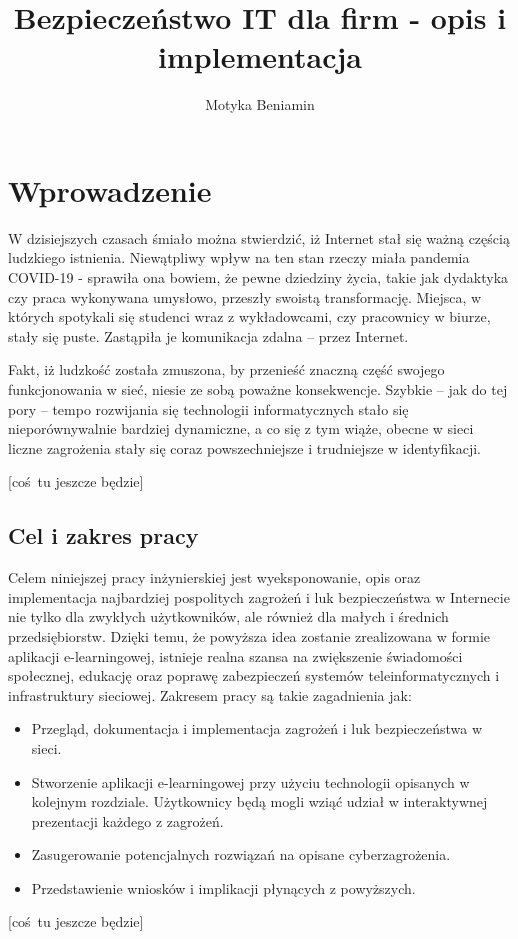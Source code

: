 \documentclass[12pt,twoside]{article}
\author{Motyka Beniamin}
\title{Bezpieczeństwo IT dla firm - opis i implementacja}
\begin{document}
\maketitle

\blankpage

\tableofcontents

\clearpage
\blankpage

\clearpage
\section{Wprowadzenie}

W dzisiejszych czasach śmiało można stwierdzić, iż	Internet stał się ważną częścią ludzkiego istnienia. Niewątpliwy wpływ na ten stan rzeczy miała pandemia COVID-19 - sprawiła ona bowiem, że pewne dziedziny życia, takie jak dydaktyka czy praca wykonywana umysłowo, przeszły swoistą transformację. Miejsca, w których spotykali się studenci wraz z wykładowcami, czy pracownicy w biurze, stały się puste. Zastąpiła je komunikacja zdalna -- przez Internet.

Fakt, iż ludzkość została zmuszona, by przenieść znaczną część swojego funkcjonowania w sieć, niesie ze sobą poważne konsekwencje. Szybkie -- jak do tej pory -- tempo rozwijania się technologii informatycznych stało się nieporównywalnie bardziej dynamiczne, a co się z tym wiąże, obecne w sieci liczne zagrożenia stały się coraz powszechniejsze i trudniejsze w identyfikacji.

[coś tu jeszcze będzie]

\subsection{Cel i zakres pracy}

Celem niniejszej pracy inżynierskiej jest wyeksponowanie, opis oraz implementacja najbardziej pospolitych zagrożeń i luk bezpieczeństwa w Internecie nie tylko dla zwykłych użytkowników, ale również dla małych i średnich przedsiębiorstw. Dzięki temu, że powyższa idea zostanie zrealizowana w formie aplikacji e-learningowej, istnieje realna szansa na zwiększenie świadomości społecznej, edukację oraz poprawę zabezpieczeń systemów teleinformatycznych i infrastruktury sieciowej. Zakresem pracy są takie zagadnienia jak:
\begin{itemize}
\item Przegląd, dokumentacja i implementacja zagrożeń i luk bezpieczeństwa w sieci.
\item Stworzenie aplikacji e-learningowej przy użyciu technologii opisanych w kolejnym rozdziale. Użytkownicy będą mogli wziąć udział w interaktywnej prezentacji każdego z zagrożeń.
\item Zasugerowanie potencjalnych rozwiązań na opisane cyberzagrożenia.
\item Przedstawienie wniosków i implikacji płynących z powyższych.\\
\end{itemize} 
[coś tu jeszcze będzie]
\end{document}
